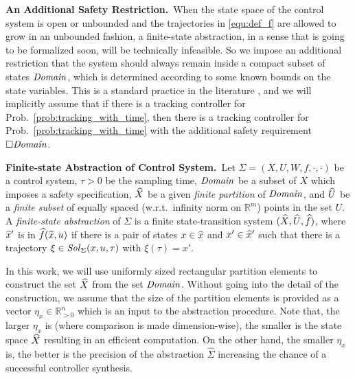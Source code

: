 \smallskip
\noindent\textbf{An Additional Safety Restriction.}\
When the state space of the control system is open or unbounded and the trajectories in \eqref{equ:def_f} are allowed to grow in an unbounded fashion, a finite-state abstraction, in a sense that is going to be formalized soon, will be technically infeasible.
So we impose an additional restriction that the system should always remain inside a compact subset of states $\mathit{Domain}$, which is determined according to some known bounds on the state variables.
This is a standard practice in the literature \cite{reissig2016feedback}, and we will implicitly assume that if there is a tracking controller for Prob.~\ref{prob:tracking_with_time}, then there is a tracking controller for Prob.~\ref{prob:tracking_with_time} with the additional safety requirement $\square \mathit{Domain}$.
%

\smallskip
\noindent\textbf{Finite-state Abstraction of Control System.}\
Let $\Sigma = (X, U, W, f, \cdot, \cdot)$ be a control system, $\tau>0$ be the sampling time, $\mathit{Domain}$ be a subset of $X$ which imposes a safety specification, $\widehat{X}$ be a given \emph{finite partition} of $\mathit{Domain}$, and $\widehat{U}$ be a \emph{finite subset} of equally spaced (w.r.t.\ infinity norm on $\mathbb{R}^m$) points in the set $U$.
A \emph{finite-state abstraction} of $\Sigma$ is a finite state-transition system $(\widehat{X},\widehat{U},\widehat{f})$, where $\widehat{x}'$ is in $\widehat{f}(\widehat{x},u)$ if there is a pair of states $x\in \widehat{x}$ and $x'\in \widehat{x}'$ such that there is a trajectory $\xi\in \mathit{Sol}_\Sigma(x,u,\tau)$ with $\xi(\tau)=x'$.

In this work, we will use uniformly sized rectangular partition elements to construct the set $\widehat{X}$ from the set $\mathit{Domain}$.
Without going into the detail of the construction, we assume that the size of the partition elements is provided as a vector $\eta_x\in \mathbb{R}^n_{>0}$ which is an input to the abstraction procedure.
Note that, the larger $\eta_x$ is (where comparison is made dimension-wise), the smaller is the state space $\widehat{X}$ resulting in an efficient computation.
On the other hand, the smaller $\eta_x$ is, the better is the precision of the abstraction $\widehat{\Sigma}$ increasing the chance of a successful controller synthesis.

